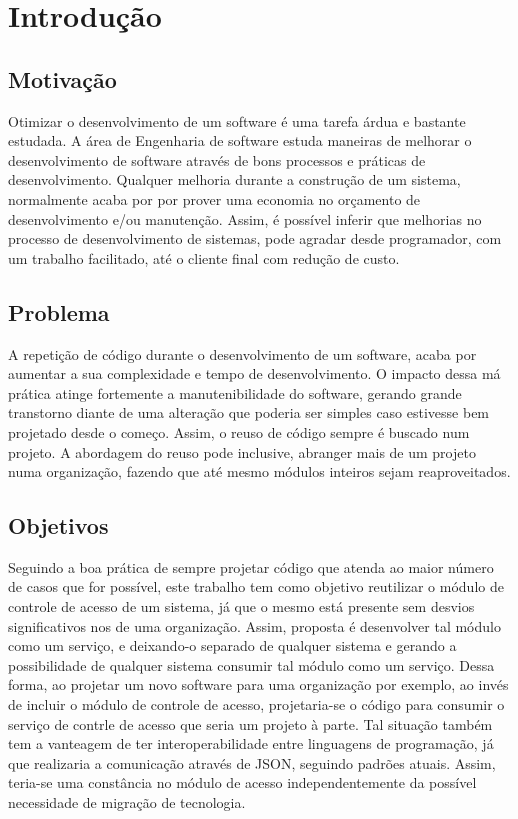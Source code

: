 \chapter{Introdução}


\section{Motivação}


Otimizar o desenvolvimento de um software é uma tarefa árdua e bastante estudada. A área de Engenharia de software estuda maneiras de melhorar o desenvolvimento de software através de bons processos e práticas de desenvolvimento. Qualquer melhoria durante a construção de um sistema, normalmente acaba por por prover uma economia no orçamento de desenvolvimento e/ou manutenção. Assim, é possível inferir que melhorias no processo de desenvolvimento de sistemas, pode agradar desde programador, com um trabalho facilitado, até o cliente final com redução de custo.

\section{Problema} %


A repetição de código durante o desenvolvimento de um software, acaba por aumentar a sua complexidade e tempo de desenvolvimento. O impacto dessa má prática atinge fortemente a manutenibilidade do software, gerando grande transtorno diante de uma alteração que poderia ser simples caso estivesse bem projetado desde o começo. Assim, o reuso de código sempre é buscado num projeto. A abordagem do reuso pode inclusive, abranger mais de um projeto numa organização, fazendo que até mesmo módulos inteiros sejam reaproveitados. 


\section{Objetivos} %


Seguindo a boa prática de sempre projetar código que atenda ao maior número de casos que for possível, este trabalho tem como objetivo reutilizar o módulo de controle de acesso de um sistema, já que o mesmo está presente sem desvios significativos nos de uma organização. Assim, proposta é desenvolver tal módulo como um serviço, e deixando-o separado de qualquer sistema e gerando a possibilidade de qualquer sistema consumir tal módulo como um serviço. Dessa forma, ao projetar um novo software para uma organização por exemplo, ao invés de incluir o módulo de controle de acesso, projetaria-se o código para consumir o serviço de contrle de acesso que seria um projeto à parte. Tal situação também tem a vanteagem de ter interoperabilidade entre linguagens de programação, já que realizaria a comunicação através de JSON, seguindo padrões atuais. Assim, teria-se uma constância no módulo de acesso independentemente da possível necessidade de migração de tecnologia.


